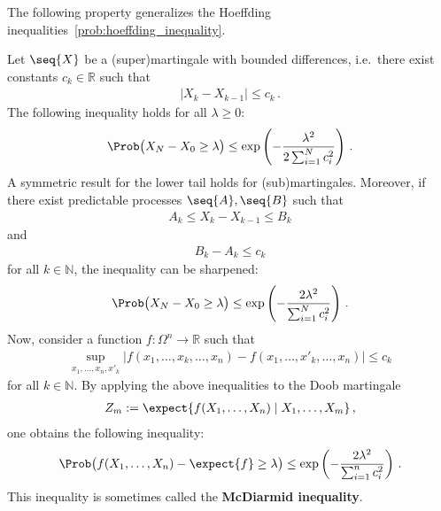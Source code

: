    The following property generalizes the Hoeffding inequalities~\cref{prob:hoeffding_inequality}.
    \begin{property}\label{prob:hoeffding_azuma}
        Let $\seq{X}$ be a (super)martingale with bounded differences, i.e.~there exist constants $c_k\in\mathbb{R}$ such that
        \begin{gather}
            |X_k-X_{k-1}|\leq c_k\,.
        \end{gather}
        The following inequality holds for all $\lambda\geq0$:
        \begin{gather}
            \Prob\bigl(X_N-X_0\geq\lambda\bigr)\leq\exp\left(-\frac{\lambda^2}{2\sum_{i=1}^Nc_i^2}\right)\,.
        \end{gather}
        A symmetric result for the lower tail holds for (sub)martingales. Moreover, if there exist predictable processes $\seq{A},\seq{B}$ such that
        \begin{gather}
            A_k\leq X_k-X_{k-1}\leq B_k
        \end{gather}
        and
        \begin{gather}
            B_k-A_k\leq c_k
        \end{gather}
        for all $k\in\mathbb{N}$, the inequality can be sharpened:
        \begin{gather}
            \Prob\bigl(X_N-X_0\geq\lambda\bigr)\leq\exp\left(-\frac{2\lambda^2}{\sum_{i=1}^Nc_i^2}\right)\,.
        \end{gather}
        Now, consider a function $f:\Omega^n\rightarrow\mathbb{R}$ such that
        \begin{gather}
            \sup_{x_1,\ldots,x_n,x'_k}|f(x_1,\ldots,x_k,\ldots,x_n)-f(x_1,\ldots,x'_k,\ldots,x_n)|\leq c_k
        \end{gather}
        for all $k\in\mathbb{N}$. By applying the above inequalities to the Doob martingale
        \begin{gather}
            Z_m:=\expect{f(X_1,\ldots,X_n)\mid X_1,\ldots,X_m}\,,
        \end{gather}
        one obtains the following inequality:
        \begin{gather}
            \Prob\bigl(f(X_1,\ldots,X_n)-\expect{f}\geq\lambda\bigr)\leq\exp\left(-\frac{2\lambda^2}{\sum_{i=1}^nc_i^2}\right)\,.
        \end{gather}
        This inequality is sometimes called the \textbf{McDiarmid inequality}.
    \end{property}

